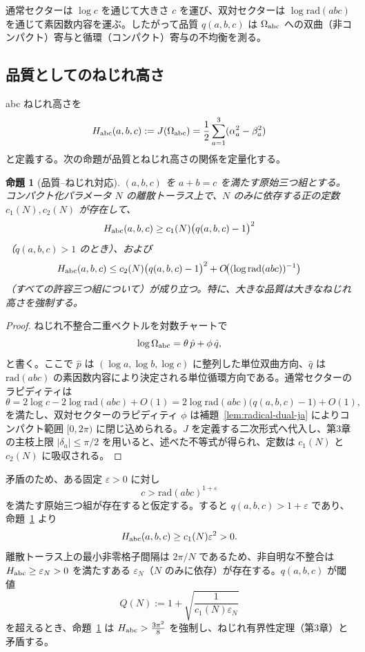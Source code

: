 \documentclass[dvipdfmx,a4paper]{article}
\newtheorem{proposition}[theorem]{命題}
\theoremstyle{definition}
\theoremstyle{remark}
\newcommand{\Jbound}{\frac{3\pi^2}{8}}
\begin{document}
通常セクターは $\log c$ を通じて大きさ $c$ を運び、双対セクターは $\log \mathrm{rad}(abc)$ を通じて素因数内容を運ぶ。したがって品質 $q(a,b,c)$ は $\Omega_{\rm abc}$ への双曲（非コンパクト）寄与と循環（コンパクト）寄与の不均衡を測る。

\subsection{品質としてのねじれ高さ}

abc ねじれ高さを
\[
H_{\rm abc}(a,b,c) := J(\Omega_{\rm abc}) = \frac12 \sum_{a=1}^3 (\alpha_a^2 - \beta_a^2)
\]
と定義する。次の命題が品質とねじれ高さの関係を定量化する。

\begin{proposition}[品質--ねじれ対応]
\label{prop:quality-torsion-ja}
$(a,b,c)$ を $a + b = c$ を満たす原始三つ組とする。コンパクト化パラメータ $N$ の離散トーラス上で、$N$ のみに依存する正の定数 $c_1(N), c_2(N)$ が存在して、
\[
H_{\rm abc}(a,b,c) \geq c_1(N) \bigl( q(a,b,c) - 1 \bigr)^2
\]
（$q(a,b,c) > 1$ のとき）、および
\[
H_{\rm abc}(a,b,c) \leq c_2(N) \bigl( q(a,b,c) - 1 \bigr)^2 + O\!\bigl( (\log \mathrm{rad}(abc))^{-1} \bigr)
\]
（すべての許容三つ組について）が成り立つ。特に、大きな品質は大きなねじれ高さを強制する。
\end{proposition}

\begin{proof}
ねじれ不整合二重ベクトルを対数チャートで
\[
\log \Omega_{\rm abc} = \theta\, \hat{p} + \phi\, \hat{q},
\]
と書く。ここで $\hat{p}$ は $(\log a, \log b, \log c)$ に整列した単位双曲方向、$\hat{q}$ は $\mathrm{rad}(abc)$ の素因数内容により決定される単位循環方向である。通常セクターのラピディティは
\[
\theta = 2 \log c - 2 \log \mathrm{rad}(abc) + O(1) = 2 \log \mathrm{rad}(abc) \bigl( q(a,b,c) - 1 \bigr) + O(1),
\]
を満たし、双対セクターのラピディティ $\phi$ は補題~\ref{lem:radical-dual-ja} によりコンパクト範囲 $[0, 2\pi)$ に閉じ込められる。$J$ を定義する二次形式へ代入し、第3章の主枝上限 $|\delta_a| \leq \pi/2$ を用いると、述べた不等式が得られ、定数は $c_1(N)$ と $c_2(N)$ に吸収される。
\end{proof}

矛盾のため、ある固定 $\varepsilon > 0$ に対し
\[
c > \mathrm{rad}(abc)^{1+\varepsilon}
\]
を満たす原始三つ組が存在すると仮定する。すると $q(a,b,c) > 1 + \varepsilon$ であり、命題~\ref{prop:quality-torsion-ja} より
\[
H_{\rm abc}(a,b,c) \geq c_1(N) \varepsilon^2 > 0.
\]
離散トーラス上の最小非零格子間隔は $2\pi/N$ であるため、非自明な不整合は $H_{\rm abc} \geq \varepsilon_N > 0$ を満たすある $\varepsilon_N$（$N$ のみに依存）が存在する。$q(a,b,c)$ が閾値
\[
Q(N) := 1 + \sqrt{\frac{1}{c_1(N) \varepsilon_N}}
\]
を超えるとき、命題~\ref{prop:quality-torsion-ja} は $H_{\rm abc} > \Jbound$ を強制し、ねじれ有界性定理（第3章）と矛盾する。
\end{document}
